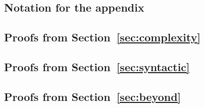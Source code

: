 \documentclass[conference]{IEEEtran}
\begin{document}





\newpage

\onecolumn
\appendix

\subsection{Notation for the appendix}


\medskip

\subsection{Proofs from Section~\ref{sec:complexity}}


\medskip

\subsection{Proofs from Section~\ref{sec:syntactic}}


\medskip

\subsection{Proofs from Section~\ref{sec:beyond}}

\end{document}
